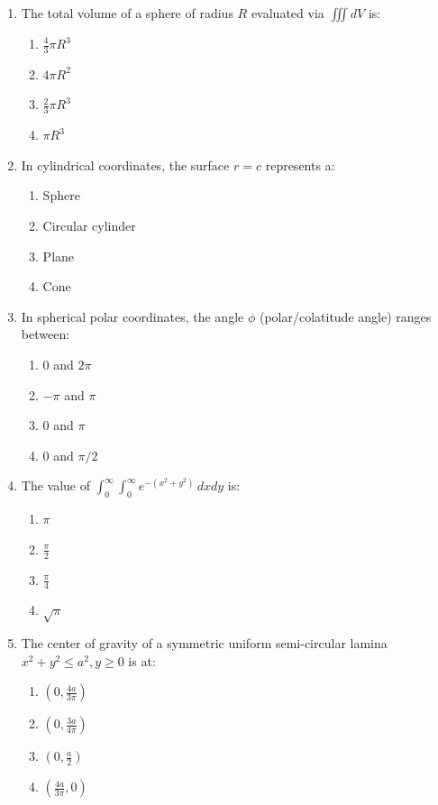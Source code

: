 \begin{enumerate}[leftmargin=1.5em]
    \item The total volume of a sphere of radius $R$ evaluated via $\iiint dV$ is:
    \begin{enumerate}[label=(\alph*)]
        \item $\frac{4}{3}\pi R^3$
        \item $4\pi R^2$
        \item $\frac{2}{3}\pi R^3$
        \item $\pi R^3$
    \end{enumerate}

    \item In cylindrical coordinates, the surface $r = c$ represents a:
    \begin{enumerate}[label=(\alph*)]
        \item Sphere
        \item Circular cylinder
        \item Plane
        \item Cone
    \end{enumerate}

    \item In spherical polar coordinates, the angle $\phi$ (polar/colatitude angle) ranges between:
    \begin{enumerate}[label=(\alph*)]
        \item $0$ and $2\pi$
        \item $-\pi$ and $\pi$
        \item $0$ and $\pi$
        \item $0$ and $\pi/2$
    \end{enumerate}

    \item The value of $\int_0^\infty \int_0^\infty e^{-(x^2+y^2)}\,dx dy$ is:
    \begin{enumerate}[label=(\alph*)]
        \item $\pi$
        \item $\frac{\pi}{2}$
        \item $\frac{\pi}{4}$
        \item $\sqrt{\pi}$
    \end{enumerate}

    \item The center of gravity of a symmetric uniform semi-circular lamina $x^2+y^2 \le a^2, y \ge 0$ is at:
    \begin{enumerate}[label=(\alph*)]
        \item $\left(0, \frac{4a}{3\pi}\right)$
        \item $\left(0, \frac{3a}{4\pi}\right)$
        \item $\left(0, \frac{a}{2}\right)$
        \item $\left(\frac{4a}{3\pi}, 0\right)$
    \end{enumerate}


\end{enumerate}
